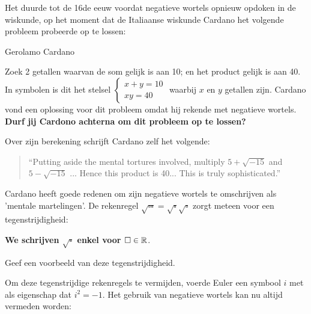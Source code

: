 \documentclass{ximera}
\begin{document}
Het duurde tot de 16de eeuw voordat negatieve wortels opnieuw opdoken in de wiskunde, op het moment dat de Italiaanse wiskunde Cardano het volgende probleem probeerde op te lossen: 


\begin{exercise}{Gerolamo Cardano}

    Zoek 2 getallen waarvan de som gelijk is aan 10; en het product gelijk is aan 40.
    In symbolen is dit het stelsel \( 
        \begin{cases}
            x + y = 10 \\
            xy = 40
        \end{cases} \)
    waarbij \(x\) en \(y\) getallen zijn. \newline
    Cardano vond een oplossing voor dit probleem omdat hij rekende met negatieve wortels. \newline
    \textbf{Durf jij Cardono achterna om dit probleem op te lossen?}
\end{exercise}


Over zijn berekening schrijft Cardano zelf het volgende: 

\begin{quote}
    “Putting aside the mental tortures involved, 
    multiply \(5 + \sqrt{-15}\) and \(5 - \sqrt{-15}\) ... 
    Hence this product is 40... 
    This is truly sophisticated.”
\end{quote}




\begin{remark}
    Cardano heeft goede redenen om zijn negatieve wortels te omschrijven als 'mentale martelingen'.
    De rekenregel \(\sqrt{\square \square} = \sqrt{\square}\sqrt{\square}\) zorgt meteen voor een tegenstrijdigheid: 
    \begin{center} 
        \textbf{We schrijven \(\sqrt{\square}\) enkel voor \( \square \in \mathbb{R} \)}. 
    \end{center}
\end{remark}


 
\begin{quickquestion*}{}
	Geef een voorbeeld van deze tegenstrijdigheid. 
\end{quickquestion*}


Om deze tegenstrijdige rekenregels te vermijden, voerde Euler een symbool \(i\) met als eigenschap dat \textbf{\(i^2 = -1\)}.
Het gebruik van negatieve wortels kan nu altijd vermeden worden: 
\end{document}

